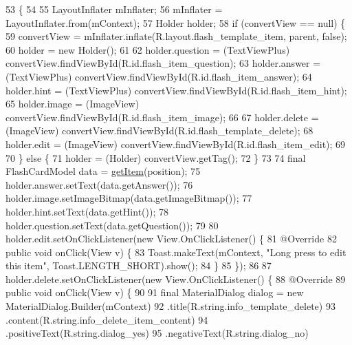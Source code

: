 \begin{DoxyCode}
53                                                                                 \{
54 
55         LayoutInflater mInflater;
56         mInflater = LayoutInflater.from(mContext);
57         Holder holder;
58         \textcolor{keywordflow}{if} (convertView == null) \{
59             convertView = mInflater.inflate(R.layout.flash\_template\_item, parent, \textcolor{keyword}{false});
60             holder = \textcolor{keyword}{new} Holder();
61 
62             holder.question = (TextViewPlus) convertView.findViewById(R.id.flash\_item\_question);
63             holder.answer = (TextViewPlus) convertView.findViewById(R.id.flash\_item\_answer);
64             holder.hint = (TextViewPlus) convertView.findViewById(R.id.flash\_item\_hint);
65             holder.image = (ImageView) convertView.findViewById(R.id.flash\_item\_image);
66 
67             holder.delete = (ImageView) convertView.findViewById(R.id.flash\_template\_delete);
68             holder.edit = (ImageView) convertView.findViewById(R.id.flash\_item\_edit);
69 
70         \} \textcolor{keywordflow}{else} \{
71             holder = (Holder) convertView.getTag();
72         \}
73 
74         \textcolor{keyword}{final} FlashCardModel data = \hyperlink{classorg_1_1buildmlearn_1_1toolkit_1_1templates_1_1FlashCardAdapter_a30e4366accf2cec71f6b642e84d610ea}{getItem}(position);
75         holder.answer.setText(data.getAnswer());
76         holder.image.setImageBitmap(data.getImageBitmap());
77         holder.hint.setText(data.getHint());
78         holder.question.setText(data.getQuestion());
79 
80         holder.edit.setOnClickListener(\textcolor{keyword}{new} View.OnClickListener() \{
81             @Override
82             \textcolor{keyword}{public} \textcolor{keywordtype}{void} onClick(View v) \{
83                 Toast.makeText(mContext, \textcolor{stringliteral}{"Long press to edit this item"}, Toast.LENGTH\_SHORT).show();
84             \}
85         \});
86 
87         holder.delete.setOnClickListener(\textcolor{keyword}{new} View.OnClickListener() \{
88             @Override
89             \textcolor{keyword}{public} \textcolor{keywordtype}{void} onClick(View v) \{
90 
91                 \textcolor{keyword}{final} MaterialDialog dialog = \textcolor{keyword}{new} MaterialDialog.Builder(mContext)
92                         .title(R.string.info\_template\_delete)
93                         .content(R.string.info\_delete\_item\_content)
94                         .positiveText(R.string.dialog\_yes)
95                         .negativeText(R.string.dialog\_no)

\end{DoxyCode}
